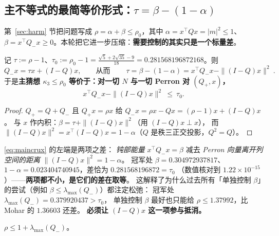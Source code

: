 \subsection{主不等式的最简等价形式：$\tau=\beta-(1-\alpha)$}\label{sec:r17:tau}

第~\ref{sec:harm} 节把问题写成 $\rho=\alpha+\beta\le\rho_0$，其中 $\alpha=x^\top Qx=|m|^2\le1$、
$\beta=x^\top Q_-x\ge0$。本轮把它进一步压缩：\textbf{需要控制的其实只是一个标量差}。

\begin{lemma}[$\tau$-形式]\label{lem:tauform}
记 $\tau:=\rho-1$、$\tau_0:=\rho_0-1=\frac{\sqrt5+2\sqrt{35}-9}{18}=0.281568196872168$。则
\begin{equation}\label{eq:tauform}
Q_-x=\tau x+(I-Q)x,\qquad\text{从而}\qquad
\boxed{\ \tau=\beta-(1-\alpha)=x^\top Q_-x-\|(I-Q)x\|^2\ } .
\end{equation}
于是\textbf{主猜想 $\kappa_3\le\rho_0$ 等价于：对一切 $N$ 与一切 Perron 对 $(Q_+,x)$，}
\begin{equation}\label{eq:maincrux}
x^\top Q_-x-\|(I-Q)x\|^2\ \le\ \tau_0 .
\end{equation}
\end{lemma}

\begin{proof}
$Q_+=Q+Q_-$ 且 $Q_+x=\rho x$ 给 $Q_-x=\rho x-Qx=(\rho-1)x+(I-Q)x$。
与 $x$ 作内积：$\beta=\tau+\|(I-Q)x\|^2$（用 $(I-Q)x\perp x$），
而 $\|(I-Q)x\|^2=x^\top(I-Q)x=1-\alpha$（$Q$ 是秩三正交投影，$Q^2=Q$）。
\end{proof}

\begin{remark}[缺口在哪里]\label{rmk:taugap}
\eqref{eq:maincrux} 的左端是两项之差：
\emph{钝部能量} $x^\top Q_-x=\beta$ 减去 \emph{Perron 向量离开列空间的距离} $\|(I-Q)x\|^2=1-\alpha$。
冠军处 $\beta=0.304972937817$、$1-\alpha=0.023404740945$，差恰为 $0.281568196872=\tau_0$
（数值核对到 $1.22\times10^{-15}$）——\textbf{两项都不小，是它们的差在取等}。
这解释了为什么过去所有「单独控制 $\beta$」的尝试（例如 $\beta\le\lambda_{\max}(Q_-)$）都注定松弛：
冠军处 $\lambda_{\max}(Q_-)=0.379920437>\tau_0$，
单独控制 $\beta$ 最好也只能给 $\rho\le1.37992$，比 Mohar 的 $1.36603$ 还差。
\textbf{必须让 $(I-Q)x$ 这一项参与抵消。}
\end{remark}

\begin{corollary}\label{cor:oneneg}
$\rho\le1+\lambda_{\max}(Q_-)$。
\end{corollary}

